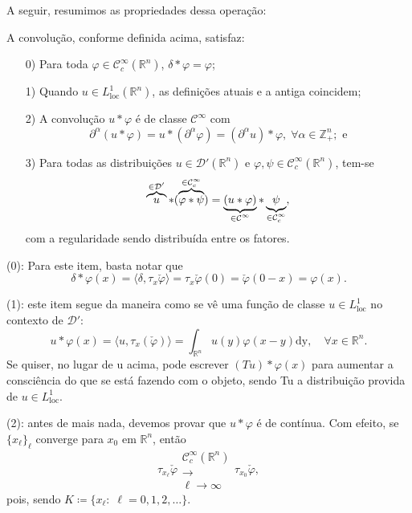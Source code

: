 \documentclass[../distribution_theory_notes.tex]{subfiles}
\begin{document}
A seguir, resumimos as propriedades dessa operação:
\begin{prop*}
	A convolução, conforme definida acima, satisfaz:
	\begin{itemize}
		\item[0)] Para toda \(\varphi \in \mathcal{C}_{c}^{\infty}(\mathbb{R}^{n})\), \(\delta * \varphi = \varphi \);
		\item[1)] Quando \(u\in L_{\mathrm{loc}}^{1}(\mathbb{R}^{n})\), as definições atuais e a antiga coincidem;
		\item[2)] A convolução \(u*\varphi \) é de classe \(\mathcal{C}^{\infty}\) com
		      \[
			      \partial^{\alpha }(u*\varphi ) = u * (\partial^{\alpha }\varphi ) = (\partial^{\alpha }u)*\varphi ,\; \forall \alpha \in \mathbb{Z}_{+}^{n}; \text{ e}
		      \]
		\item[3)] Para todas as distribuições \(u\in \mathcal{D}'(\mathbb{R}^{n})\) e \(\varphi , \psi \in \mathcal{C}_{c}^{\infty}(\mathbb{R}^{n})\), tem-se
		      \[
			      \overbrace{u}^{\mathcal{\in \mathcal{D}'}}*(\overbrace{\varphi* \psi}^{\mathclap{\in \mathcal{C}_{c}^{\infty}}} )= \underbrace{(u*\varphi )}_{\mathclap{\in \mathcal{C}^{\infty}}}*\underbrace{\psi}_{\mathclap{\in \mathcal{C}_{c}^{\infty}}},
		      \]
		      com a regularidade sendo distribuída entre os fatores.
	\end{itemize}
\end{prop*}
\begin{proof*}
	(0): Para este item, basta notar que
	\[
		\delta *\varphi (x) = \langle \delta , \tau_{x}\check{\varphi } \rangle = \tau_{x}\check{\varphi }(0) = \check{\varphi }(0-x) = \varphi (x).
	\]

	(1): este item segue da maneira como se vê uma função de classe \(u\in L_{\mathrm{loc}}^{1}\) no contexto de \(\mathcal{D}'\):
	\[
		u*\varphi (x) = \langle u, \tau_{x}(\check{\varphi}) \rangle = \int_{\mathbb{R}^{n}}^{}u(y)\varphi (x-y) \mathrm{dy},\quad \forall x\in \mathbb{R}^{n}.
	\]
	Se quiser, no lugar de u acima, pode escrever \((Tu)*\varphi (x)\) para aumentar a consciência do que se está fazendo com o objeto, sendo Tu a distribuição provida de \(u\in L_{\mathrm{loc}}^{1}\).

	(2): antes de mais nada, devemos provar que \(u*\varphi \) é de contínua. Com efeito, se \(\{x_{\ell}\}_{\ell}\) converge para \(x_{0}\) em \(\mathbb{R}^{n}\), então
	\[
		\tau_{x_{\ell}}\check{\varphi }\substack{ \mathcal{C}_{c}^{\infty}(\mathbb{R}^{n})\\ \longrightarrow \\ \ell \to \infty}\tau_{x_{0}}\check{\varphi },
	\]
	pois, sendo \(K\coloneqq \{x_{\ell}:\; \ell =0,1,2,\dotsc \}.\)
\end{proof*}
\end{document}
